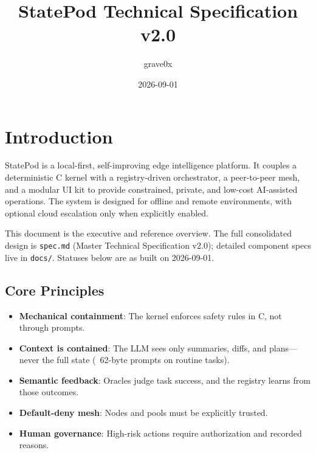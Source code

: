 \documentclass[11pt,a4paper]{article}
\title{\textbf{StatePod Technical Specification v2.0}}
\author{grave0x}
\date{2026-09-01}
\begin{document}
\maketitle
\tableofcontents
\clearpage

\section{Introduction}
StatePod is a local-first, self-improving edge intelligence platform. It couples a deterministic C kernel with a registry-driven orchestrator, a peer-to-peer mesh, and a modular UI kit to provide constrained, private, and low-cost AI-assisted operations. The system is designed for offline and remote environments, with optional cloud escalation only when explicitly enabled.

This document is the executive and reference overview. The full consolidated design is \texttt{spec.md} (Master Technical Specification v2.0); detailed component specs live in \texttt{docs/}. Statuses below are as built on 2026-09-01.

\subsection{Core Principles}
\begin{itemize}
    \item \textbf{Mechanical containment}: The kernel enforces safety rules in C, not through prompts.
    \item \textbf{Context is contained}: The LLM sees only summaries, diffs, and plans---never the full state (~62-byte prompts on routine tasks).
    \item \textbf{Semantic feedback}: Oracles judge task success, and the registry learns from those outcomes.
    \item \textbf{Default-deny mesh}: Nodes and pools must be explicitly trusted.
    \item \textbf{Human governance}: High-risk actions require authorization and recorded reasons.
\end{itemize}
\end{document}
